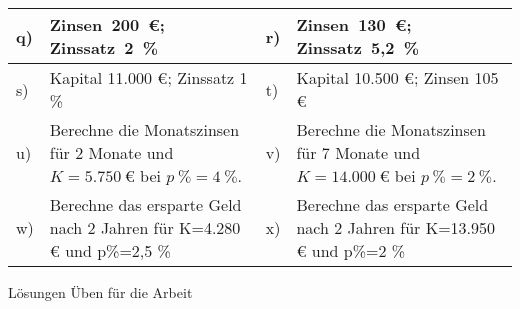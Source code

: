 \documentclass[12pt]{article}
\begin{document}
\begin{xltabular}{\textwidth}{|C{0.75cm}|X|C{0.75cm}|X|}
\\\hline
q)&Zinsen~200~€;  Zinssatz~2~\%
&
r)&Zinsen~130~€;  Zinssatz~5,2~\%
\\\hline
s)&Kapital 11.000 €;  Zinssatz 1  \%
&
t)&Kapital 10.500 €;  Zinsen 105  €
\\\hline
u)&Berechne die Monatszinsen für 2 Monate und $K=5.750~€$ bei $p~\%=4~\%$.
&
v)&Berechne die Monatszinsen für 7 Monate und $K=14.000~€$ bei $p~\%=2~\%$.
\\\hline
w)&Berechne das ersparte Geld nach 2 Jahren für K=4.280 € und p\%=2,5 \%
&
x)&Berechne das ersparte Geld nach 2 Jahren für K=13.950 € und p\%=2 \%
\\\hline
\end{xltabular}
\vspace{0.5cm}
\newpage
{}
\centerline{{\large Lösungen Üben für die Arbeit}} 
\vspace{0.5cm}
\end{document}
